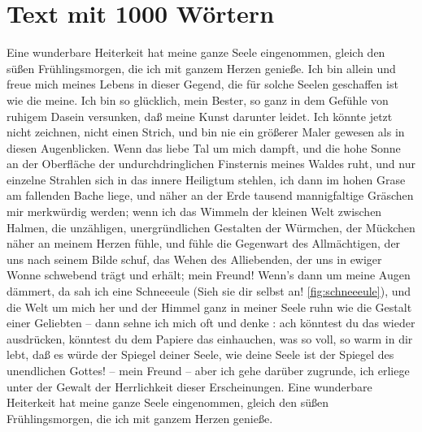 \documentclass{scrreprt}
\begin{document}
	\section{Text mit 1000 Wörtern \cite{ref1}} 
	Eine wunderbare Heiterkeit hat meine ganze Seele eingenommen, gleich den süßen Frühlingsmorgen, die ich mit ganzem Herzen genieße. Ich bin allein und freue mich meines Lebens in dieser Gegend, die für solche Seelen geschaffen ist wie die meine. Ich bin so glücklich, mein Bester, so ganz in dem Gefühle von ruhigem Dasein versunken, daß meine Kunst darunter leidet.
	 Ich könnte jetzt nicht zeichnen, nicht einen Strich, und bin nie ein größerer Maler gewesen als in diesen Augenblicken. Wenn das liebe Tal um mich dampft, und die hohe Sonne an der Oberfläche der undurchdringlichen Finsternis meines Waldes ruht, und nur einzelne Strahlen sich in das innere Heiligtum stehlen, ich dann im hohen Grase am fallenden Bache liege, und näher an der Erde tausend mannigfaltige Gräschen mir merkwürdig werden; wenn ich das Wimmeln der kleinen Welt zwischen Halmen, die unzähligen, unergründlichen Gestalten der Würmchen, der Mückchen näher an meinem Herzen fühle, und fühle die Gegenwart des Allmächtigen, der uns nach seinem Bilde schuf, das Wehen des Alliebenden, der uns in ewiger Wonne schwebend trägt und erhält; mein Freund! Wenn’s dann um meine Augen dämmert, da sah ich eine Schneeeule (Sieh sie dir selbst an! \ref{fig:schneeeule}), und die Welt um mich her und der Himmel ganz in meiner Seele ruhn wie die Gestalt einer Geliebten – dann sehne ich mich oft und denke : ach könntest du das wieder ausdrücken, könntest du dem Papiere das einhauchen, was so voll, so warm in dir lebt, daß es würde der Spiegel deiner Seele, wie deine Seele ist der Spiegel des unendlichen Gottes! – mein Freund – aber ich gehe darüber zugrunde, ich erliege unter der Gewalt der Herrlichkeit dieser Erscheinungen. Eine wunderbare Heiterkeit hat meine ganze Seele eingenommen, gleich den süßen Frühlingsmorgen, die ich mit ganzem Herzen genieße.\\
	
\end{document}
